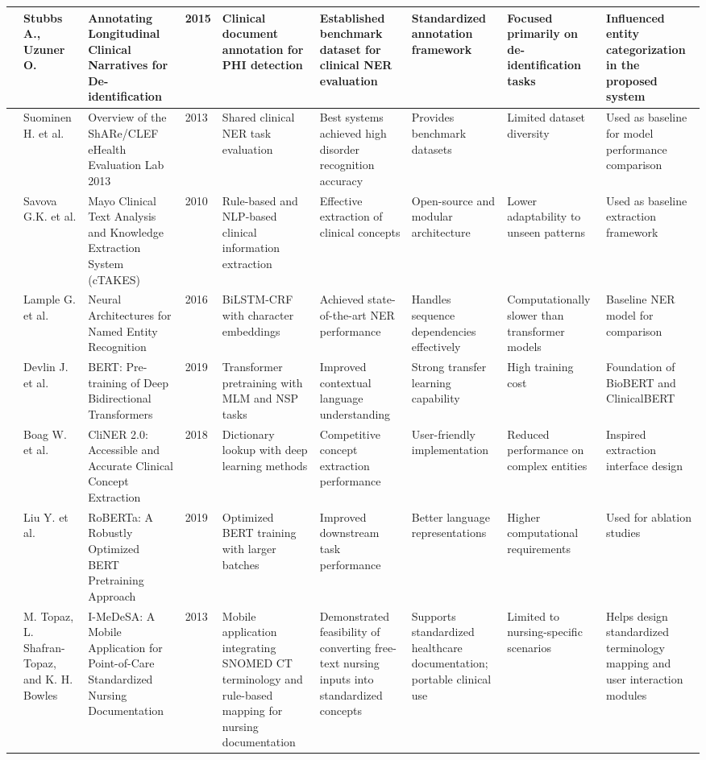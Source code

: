 \begin{landscape}
\begin{singlespace}
\begin{longtable}{|p{0.8cm}|p{1.8cm}|p{3.2cm}|p{0.8cm}|p{3.6cm}|p{3.6cm}|p{2.5cm}|p{2.5cm}|p{3.2cm}|}
\hline
\cite{ref4} & Stubbs A., Uzuner O. & Annotating Longitudinal Clinical Narratives for De-identification & 2015 & Clinical document annotation for PHI detection & Established benchmark dataset for clinical NER evaluation & Standardized annotation framework & Focused primarily on de-identification tasks & Influenced entity categorization in the proposed system \\
\hline
\cite{ref5} & Suominen H. et al. & Overview of the ShARe/CLEF eHealth Evaluation Lab 2013 & 2013 & Shared clinical NER task evaluation & Best systems achieved high disorder recognition accuracy & Provides benchmark datasets & Limited dataset diversity & Used as baseline for model performance comparison \\
\hline
\cite{ref6} & Savova G.K. et al. & Mayo Clinical Text Analysis and Knowledge Extraction System (cTAKES) & 2010 & Rule-based and NLP-based clinical information extraction & Effective extraction of clinical concepts & Open-source and modular architecture & Lower adaptability to unseen patterns & Used as baseline extraction framework \\
\hline
\cite{ref7} & Lample G. et al. & Neural Architectures for Named Entity Recognition & 2016 & BiLSTM-CRF with character embeddings & Achieved state-of-the-art NER performance & Handles sequence dependencies effectively & Computationally slower than transformer models & Baseline NER model for comparison \\
\hline
\cite{ref8} & Devlin J. et al. & BERT: Pre-training of Deep Bidirectional Transformers & 2019 & Transformer pretraining with MLM and NSP tasks & Improved contextual language understanding & Strong transfer learning capability & High training cost & Foundation of BioBERT and ClinicalBERT \\
\hline
\cite{ref9} & Boag W. et al. & CliNER 2.0: Accessible and Accurate Clinical Concept Extraction & 2018 & Dictionary lookup with deep learning methods & Competitive concept extraction performance & User-friendly implementation & Reduced performance on complex entities & Inspired extraction interface design \\
\hline
\cite{ref10} & Liu Y. et al. & RoBERTa: A Robustly Optimized BERT Pretraining Approach & 2019 & Optimized BERT training with larger batches & Improved downstream task performance & Better language representations & Higher computational requirements & Used for ablation studies \\
\hline
\cite{ref11} & M. Topaz, L. Shafran-Topaz, and K. H. Bowles & I-MeDeSA: A Mobile Application for Point-of-Care Standardized Nursing Documentation & 2013 & Mobile application integrating SNOMED CT terminology and rule-based mapping for nursing documentation & Demonstrated feasibility of converting free-text nursing inputs into standardized concepts & Supports standardized healthcare documentation; portable clinical use & Limited to nursing-specific scenarios & Helps design standardized terminology mapping and user interaction modules \\

\end{longtable}
\end{singlespace}
\end{landscape}
